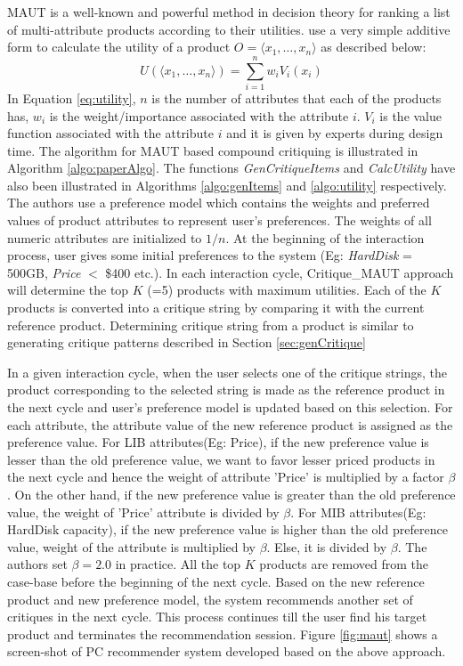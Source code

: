 MAUT is a well-known  and powerful method in decision theory for ranking a list of multi-attribute products according to their utilities.
\cite{mautPaper} use a very simple additive form to calculate the utility of a product $O = \langle x_1,\hdots,x_n\rangle$ as described below:
\begin{equation}
\label{eq:utility}
U(\langle x_1,\hdots,x_n \rangle) = \sum_{i=1}^n w_iV_i(x_i)
\end{equation}
%
In Equation \ref{eq:utility}, $n$ is the number of attributes that each of the products has, $w_i$ is the weight/importance associated with the attribute $i$. 
$V_i$ is the value function associated with the attribute $i$ and it is given by experts during design time.
The algorithm for MAUT based compound critiquing is illustrated in Algorithm \ref{algo:paperAlgo}.
The functions \textit{GenCritiqueItems} and \textit{CalcUtility} have also been illustrated in Algorithms \ref{algo:genItems} and \ref{algo:utility} respectively.
The authors use a preference model which contains the weights and preferred values of product attributes to represent user's preferences.
The weights of all numeric attributes are initialized to $1/n$.
At the beginning of the interaction process, user gives some initial preferences to the system (Eg: \textit{HardDisk} = 500GB, \textit{Price} $<$ \$400 etc.).
In each interaction cycle, Critique\_MAUT approach will determine the top $K$ (=5) products with maximum utilities.
Each of the $K$ products is converted into a critique string by comparing it with the current reference product.
Determining critique string from a product is similar to generating critique patterns described in Section \ref{sec:genCritique}

In a given interaction cycle, when the user selects one of the critique strings, the product corresponding to the selected string is made as the reference product in the next cycle and user's preference model is updated based on this selection.
For each attribute, the attribute value of the new reference product is assigned as the preference value.
For LIB attributes(Eg: Price), if the new preference value is lesser than the old preference value, we want to favor lesser priced products in the next cycle and hence the weight of attribute 'Price' is multiplied by a factor $\beta$.
On the other hand, if the new preference value is greater than the old preference value, the weight of 'Price' attribute is divided by $\beta$.
For MIB attributes(Eg: HardDisk capacity), if the new preference value is higher than the old preference value, weight of the attribute is multiplied by $\beta$. Else, it is divided by $\beta$.
The authors set $\beta = 2.0$ in practice.
All the top $K$ products are removed from the case-base before the beginning of the next cycle.
Based on the new reference product and new preference model, the system recommends another set of critiques in the next cycle.
This process continues till the user find his target product and terminates the recommendation session.
Figure \ref{fig:maut} shows a screen-shot of PC recommender system developed based on the above approach.


